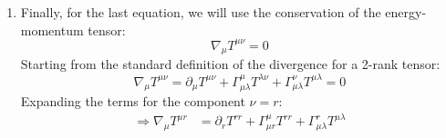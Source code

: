 \documentclass[12pt]{report}
\begin{document}
\begin{enumerate}
		Analogously, 
		\begin{align*}
			G_{rr}&=R_{rr}-\frac{1}{2}X^2(g^{tt}R_{tt}+g^{\theta\theta}R_{\theta\theta}+g^{\phi\phi}R_{\phi\phi})\\
			G_{rr} &= \frac{\alpha'X'}{2\alpha X}-\frac{\alpha''}{2\alpha}+\frac{X'}{rX}+\frac{\alpha''}{2\alpha}-\frac{\alpha'X'}{2\alpha X}+\frac{\alpha'}{r\alpha}
			-\frac{X'}{rX}+\frac{\alpha'}{r\alpha}+\frac{1}{r^2}-\frac{X^2}{r^2}
		\end{align*}
		
		\begin{equation*}
			\therefore \boxed{G_{rr}=\frac{2\alpha'}{r\alpha}+\frac{1-X^2}{r^2}}
		\end{equation*}
		
		\begin{align*}
			&\Rightarrow G_{rr} = 8\pi T_{rr} \\
			&\frac{2\alpha'}{\alpha r} + \frac{1}{r^2} - \frac{1}{r^2\left(1-\frac{2m(r)}{r}\right)} = 8\pi P\left(1-\frac{2m(r)}{r}\right) \\
			&\Rightarrow\frac{\alpha'}{\alpha} = \frac{4\pi P r}{1-\frac{2m(r)}{r}} + \frac{1}{2r}\;\frac{1}{1-\frac{2m(r)}{r}} - \frac{1}{2r} \\
			&= \frac{1}{1-\frac{2m(r)}{r}}\left[4\pi P r + \frac{1}{2r}\;\left(1-\left(1-\frac{2m(r)}{r}\right)\right)\right] \\
			&= \frac{1}{1-\frac{2m(r)}{r}}\left(4\pi Pr + \frac{m(r)}{r^2}\right)
		\end{align*}
		\begin{equation}
			\therefore \boxed{\Rightarrow \frac{\alpha'}{\alpha}= \frac{1}{\alpha}\frac{d\alpha}{dr}=\frac{m(r) + 4\pi P r^3}{r^2\left(1-\frac{2m(r)}{r}\right)}}
		\end{equation}
		\item Finally, for the last equation, we will use the conservation of the energy-momentum tensor:
		\begin{equation}
			\nabla_\mu T^{\mu\nu} = 0
		\end{equation}
		Starting from the standard definition of the divergence for a 2-rank tensor:%
		\begin{equation}
			\nabla_\mu T^{\mu\nu} = \partial_\mu T^{\mu\nu} + \Gamma^\mu_{\mu\lambda}T^{\lambda\nu} + \Gamma^\nu_{\mu\lambda}T^{\mu\lambda} = 0    
		\end{equation}
		Expanding the terms for the component $\nu = r$:
		\begin{align*}
			\Rightarrow \nabla_\mu T^{\mu r} &= \partial_r T^{rr} + \Gamma^\mu_{\mu r}T^{rr} + \Gamma^r_{\mu\lambda}T^{\mu\lambda}\\

\end{align*}
\end{enumerate}
\end{document}
